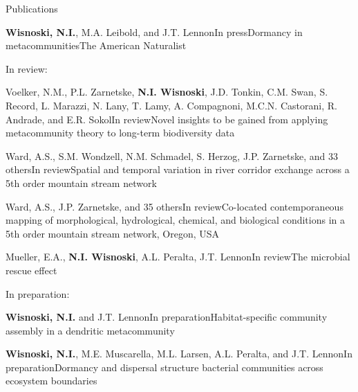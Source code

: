 \documentclass{resume} %
\begin{document}
\bigskip
\newpage

\begin{rhangSection}{Publications}

\begin{Publication}{{\bf Wisnoski, N.I.}, M.A. Leibold, and J.T. Lennon}{In press}{Dormancy in metacommunities}{The American Naturalist}
\end{Publication}

\bigskip
{ In review:}

\begin{Prep}{Voelker, N.M., P.L. Zarnetske, {\bf N.I. Wisnoski}, J.D. Tonkin, C.M. Swan, S. Record, L. Marazzi, N. Lany, T. Lamy, A. Compagnoni, M.C.N. Castorani, R. Andrade, and E.R. Sokol}{In review}{Novel insights to be gained from applying metacommunity theory to long-term biodiversity data}{}
\end{Prep}

\begin{Prep}{Ward, A.S., S.M. Wondzell, N.M. Schmadel, S. Herzog, J.P. Zarnetske, and 33 others}{In review}{Spatial and temporal variation in river corridor exchange across a 5th order mountain stream network}{}
\end{Prep}

\begin{Prep}{Ward, A.S., J.P. Zarnetske, and 35 others}{In review}{Co-located contemporaneous mapping of morphological, hydrological, chemical, and biological conditions in a 5th order mountain stream network, Oregon, USA}{}
\end{Prep}

\begin{Prep}{Mueller, E.A., {\bf N.I. Wisnoski}, A.L. Peralta, J.T. Lennon}{In review}{The microbial rescue effect}{}
\end{Prep}


\bigskip
{ In preparation:}

\begin{Prep}{{\bf Wisnoski, N.I.} and J.T. Lennon}{In preparation}{Habitat-specific community assembly in a dendritic metacommunity}{}
\end{Prep}

\begin{Prep}{{\bf Wisnoski, N.I.}, M.E. Muscarella, M.L. Larsen, A.L. Peralta, and J.T. Lennon}{In preparation}{Dormancy and dispersal structure bacterial communities across ecosystem boundaries}{}
\end{Prep}


\end{rhangSection}
\end{document}
